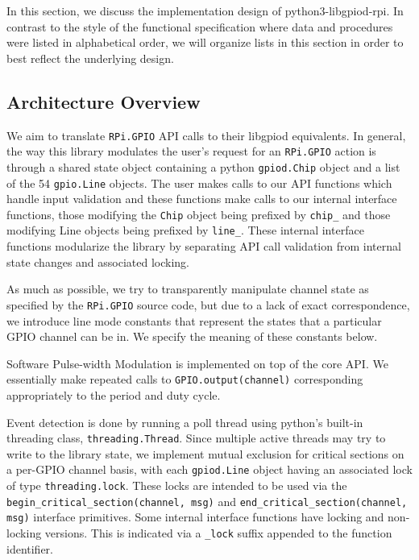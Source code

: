 \documentclass[12pt]{article}
\begin{document}
In this section, we discuss the implementation design of python3-libgpiod-rpi. In contrast to the style of the functional specification where data and procedures were listed in alphabetical order, we will organize lists in this section in order to best reflect the underlying design.

\subsection{Architecture Overview}

We aim to translate \texttt{RPi.GPIO} API calls to their libgpiod equivalents. In general, the way this library modulates the user's request for an \texttt{RPi.GPIO} action is through a shared state object containing a python \texttt{gpiod.Chip} object and a list of the 54 \texttt{gpio.Line} objects. The user makes calls to our API functions which handle input validation and these functions make calls to our internal interface functions, those modifying the \texttt{Chip} object being prefixed by \texttt{chip\_} and those modifying Line objects being prefixed by \texttt{line\_}. These internal interface functions modularize the library by separating API call validation from internal state changes and associated locking.

As much as possible, we try to transparently manipulate channel state as specified by the \texttt{RPi.GPIO} source code, but due to a lack of exact correspondence, we introduce line mode constants that represent the states that a particular GPIO channel can be in. We specify the meaning of these constants below.

Software Pulse-width Modulation is implemented on top of the core API.
We essentially make repeated calls to \texttt{GPIO.output(channel)} corresponding appropriately to the period and duty cycle.

Event detection is done by running a poll thread using python's
built-in threading class, \texttt{threading.Thread}.
Since multiple active threads may try to write to the library state,
we implement mutual exclusion for critical sections on a per-GPIO channel basis,
with each \texttt{gpiod.Line} object having an associated lock of type
\texttt{threading.lock}. These locks are intended to be used via
the \texttt{begin\_critical\_section(channel, msg)} and
\sloppy
\texttt{end\_critical\_section(channel, msg)} interface
primitives. Some internal interface functions have locking and non-locking versions.
This is indicated via a \texttt{\_lock} suffix appended to the function identifier.
\end{document}
